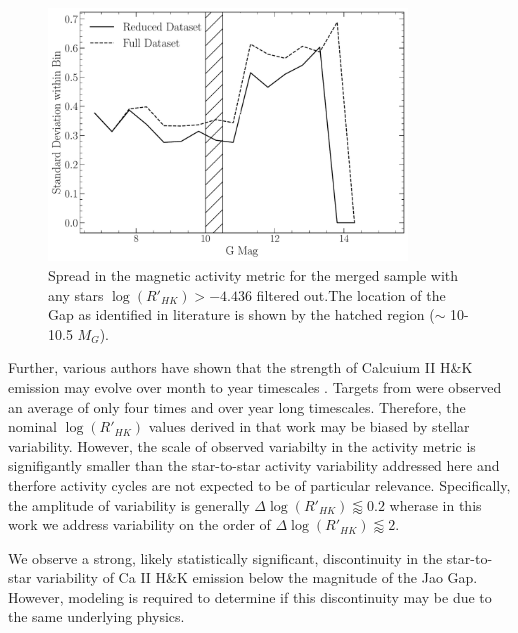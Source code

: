 \begin{figure}
  \centering
  \includegraphics[width=0.85\textwidth]{figures/jaoMagActivity/ReducedDeviation.pdf}
  \caption{Spread in the magnetic activity metric for the merged sample with
  any stars $\log(R'_{HK}) > -4.436$ filtered out.The location of the Gap
  as identified in literature is shown by the hatched region ($\sim$ 10-10.5 $M_{G}$).}
  \label{fig:reduced}
\end{figure}

Further, various authors have shown that the strength of Calcuium II
H\&K emission may evolve over month to year timescales
\citep[e.g.][]{Rauscher2006, Perdelwitz2021, Cretignier2024}. Targets from
\citet{Boudreaux2022} were observed an average of only four times and over year
long timescales. Therefore, the nominal $\log(R'_{HK})$ values derived in that
work may be biased by stellar variability. However, the scale of observed
variabilty in the activity metric is signifigantly smaller than the
star-to-star activity variability addressed here and therfore activity cycles
are not expected to be of particular relevance. Specifically, the amplitude of
variability is generally $\Delta \log(R'_{HK}) \lessapprox 0.2$ wherase in this
work we address variability on the order of $\Delta \log(R'_{HK}) \lessapprox 2$.

We observe a strong, likely statistically significant, discontinuity in the
star-to-star variability of Ca II H\&K emission below the magnitude
of the Jao Gap. However, modeling is required to determine if this discontinuity
may be due to the same underlying physics.

